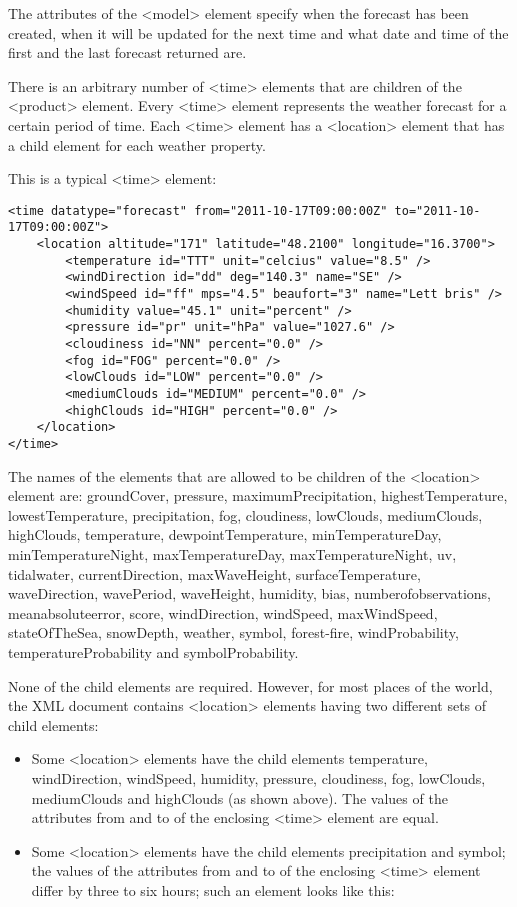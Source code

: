 The attributes of the <model> element specify when the forecast has been created, when it will be updated for the next time and what date and time of the first and the last forecast returned are.

There is an arbitrary number of <time> elements that are children of the <product> element. Every <time> element represents the weather forecast for a certain period of time. Each <time> element has a <location> element that has a child element for each weather property.

This is a typical <time> element:

\begin{lstlisting}
<time datatype="forecast" from="2011-10-17T09:00:00Z" to="2011-10-17T09:00:00Z">
	<location altitude="171" latitude="48.2100" longitude="16.3700">
		<temperature id="TTT" unit="celcius" value="8.5" />
		<windDirection id="dd" deg="140.3" name="SE" />
		<windSpeed id="ff" mps="4.5" beaufort="3" name="Lett bris" />
		<humidity value="45.1" unit="percent" />
		<pressure id="pr" unit="hPa" value="1027.6" />
		<cloudiness id="NN" percent="0.0" />
		<fog id="FOG" percent="0.0" />
		<lowClouds id="LOW" percent="0.0" />
		<mediumClouds id="MEDIUM" percent="0.0" />
		<highClouds id="HIGH" percent="0.0" />
	</location>
</time>
\end{lstlisting}

The names of the elements that are allowed to be children of the <location> element are: groundCover, pressure, maximumPrecipitation, highestTemperature, lowestTemperature, precipitation, fog, cloudiness, lowClouds, mediumClouds, highClouds, temperature, dewpointTemperature, minTemperatureDay, minTemperatureNight, maxTemperatureDay, maxTemperatureNight, uv, tidalwater, currentDirection, maxWaveHeight, surfaceTemperature, waveDirection, wavePeriod, waveHeight, humidity, bias, numberofobservations, meanabsoluteerror, score, windDirection, windSpeed, maxWindSpeed, stateOfTheSea, snowDepth, weather, symbol, forest-fire, windProbability, temperatureProbability and symbolProbability.

None of the child elements are required. However, for most places of the world, the XML document contains <location> elements having two different sets of child elements:

\begin{itemize}
  \item Some <location> elements have the child elements temperature, windDirection, windSpeed, humidity, pressure, cloudiness, fog, lowClouds, mediumClouds and highClouds (as shown above). The values of the attributes from and to of the enclosing <time> element are equal.
  \item Some <location> elements have the child elements precipitation and symbol; the values of the attributes from and to of the enclosing <time> element differ by three to six hours; such an element looks like this:
\end{itemize}

